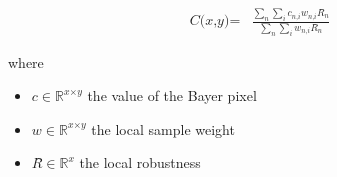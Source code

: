 \documentclass[12pt]{article}
\begin{document}
\begin{align*}
\textit{C(x,y)} = & \frac{\sum_\textit{n} \sum_\textit{i} \textit{c}_{\textit{n}, \textit{i}}\textit{w}_{\textit{n}, \textit{i}}\textit{R̂}_{ \textit{n} }}{\sum_\textit{n} \sum_\textit{i} \textit{w}_{\textit{n}, \textit{i}}\textit{R̂}_{ \textit{n} }}
\end{align*}

where
\begin{itemize}
\item $\textit{c} \in \mathbb{R}^{ \textit{x} \times \textit{y} }$ the value of the Bayer pixel
\item $\textit{w} \in \mathbb{R}^{ \textit{x} \times \textit{y} }$ the local sample weight
\item $\textit{R̂} \in \mathbb{R}^{ \textit{x}}$ the local robustness
\end{itemize}
\end{document}
